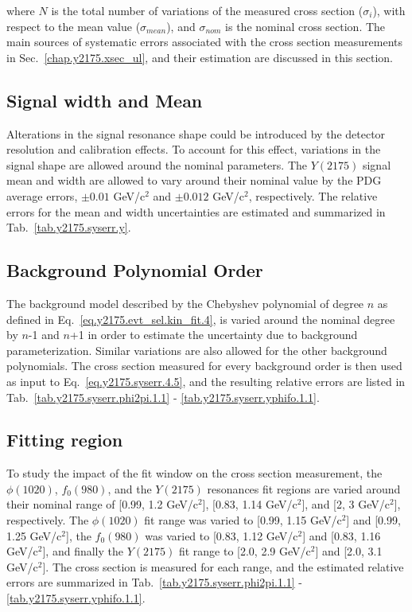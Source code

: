 \noindent where $N$ is the total number of variations of the measured cross section ($\sigma_{i}$), with respect to the mean value ($\sigma_{mean}$), and $\sigma_{nom}$ is the nominal cross section. The main sources of systematic errors associated with the cross section measurements in Sec.~\ref{chap.y2175.xsec_ul}, and their estimation are discussed in this section.

\subsection{Signal width and Mean}
\label{chap.y2175.syserr.sig}

Alterations in the signal resonance shape could be introduced by the detector resolution and calibration effects. To account for this effect, variations in the signal shape are allowed around the nominal parameters. The $Y(2175)$ signal mean and width are allowed to vary around their nominal value by the PDG average errors, $\pm 0.01$ GeV/c$^2$ and $\pm 0.012$ GeV/c$^2$, respectively. The relative errors for the mean and width uncertainties are estimated and summarized in Tab.~\ref{tab.y2175.syserr.y}.

\subsection{Background Polynomial Order}
\label{chap.y2175.syserr.bkg}

The background model described by the Chebyshev polynomial of degree $n$ as defined in Eq.~\ref{eq.y2175.evt_sel.kin_fit.4}, is varied around the nominal degree by $n$-1 and $n$+1 in order to estimate the uncertainty due to background parameterization. Similar variations are also allowed for the other background polynomials. The cross section measured for every background order is then used as input to Eq.~\ref{eq.y2175.syserr.4.5}, and the resulting relative errors are listed in Tab.~\ref{tab.y2175.syserr.phi2pi.1.1} - \ref{tab.y2175.syserr.yphifo.1.1}.

\subsection{Fitting region}
\label{chap.y2175.syserr.range}

To study the impact of the fit window on the cross section measurement, the $\phi(1020)$, $f_{0}(980)$, and the $Y(2175)$  resonances fit regions are varied around their nominal range of [0.99, 1.2 GeV/c$^2$], [0.83, 1.14 GeV/c$^2$], and [2, 3 GeV/c$^2$], respectively. The $\phi(1020)$ fit range was varied to [0.99, 1.15 GeV/c$^2$] and [0.99, 1.25 GeV/c$^2$], the $f_{0}(980)$ was varied to [0.83, 1.12 GeV/c$^2$] and [0.83, 1.16 GeV/c$^2$], and finally the $Y(2175)$ fit range to [2.0, 2.9 GeV/c$^2$] and [2.0, 3.1 GeV/c$^2$]. The cross section is measured for each range, and the estimated relative errors are summarized in Tab.~\ref{tab.y2175.syserr.phi2pi.1.1} - \ref{tab.y2175.syserr.yphifo.1.1}.

